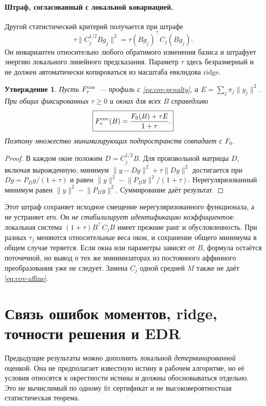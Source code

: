 \documentclass[11pt,a4paper]{article}
\newcommand{\norm}[1]{\lVert#1\rVert}
\newtheorem{proposition}[theorem]{Утверждение}
\theoremstyle{remark}
\begin{document}
\paragraph{Штраф, согласованный с локальной ковариацией.}
Другой статистический критерий получается при штрафе
\begin{equation}\label{eq:cov-penalty}
 \tau\norm{C_j^{1/2}Bg_j}^2
 =\tau (Bg_j)^\top C_j(Bg_j).
\end{equation}
Он инвариантен относительно любого обратимого изменения базиса и
штрафует энергию локального линейного предсказания. Параметр $\tau$
здесь безразмерный и не должен автоматически копироваться из масштаба
евклидова ridge.
\begin{proposition}\label{prop:cov-penalty}
Пусть $F^{\rm cov}_\tau$ --- профиль с \eqref{eq:cov-penalty},
а $E=\sum_j\pi_j\norm{y_j}^2$. При общих фиксированных $\tau\ge0$
и окнах для всех $B$ справедливо
\begin{equation}\label{eq:cov-affine}
 \boxed{\displaystyle F^{\rm cov}_\tau(B)
 =\frac{F_0(B)+\tau E}{1+\tau}.}
\end{equation}
Поэтому множество минимизирующих подпространств совпадает с $F_0$.
\end{proposition}
\begin{proof}
В каждом окне положим $D=C_j^{1/2}B$. Для произвольной матрицы $D$,
включая вырожденную, минимум
$\norm{y-Dg}^2+\tau\norm{Dg}^2$
достигается при $Dg=P_Dy/(1+\tau)$ и равен
$\norm{y}^2-\norm{P_Dy}^2/(1+\tau)$.
Нерегуляризованный минимум равен
$\norm{y}^2-\norm{P_Dy}^2$. Суммирование даёт результат.
\end{proof}

Этот штраф сохраняет исходное смещение нерегуляризованного функционала,
а не устраняет его. Он \emph{не стабилизирует идентификацию коэффициентов}:
локальная система $(1+\tau)B^\top C_jB$ имеет прежние ранг и
обусловленность. При разных $\tau_j$ меняются относительные веса окон,
и сохранение общего минимума в общем случае теряется. Если окна или
параметры зависят от $B$, формула остаётся поточечной, но вывод о тех же
минимизаторах из постоянного аффинного преобразования уже не следует.
Замена $C_j$ одной средней $M$ также не даёт \eqref{eq:cov-affine}.

\section{Связь ошибок моментов, ridge, точности решения и EDR}

Предыдущие результаты можно дополнить локальной \emph{детерминированной}
оценкой. Она не предполагает известную истину в рабочем алгоритме,
но её условия относятся к окрестности истины и должны обосновываться
отдельно. Это не вычислимый по одному fit сертификат и не
высоковероятностная статистическая теорема.
\end{document}
